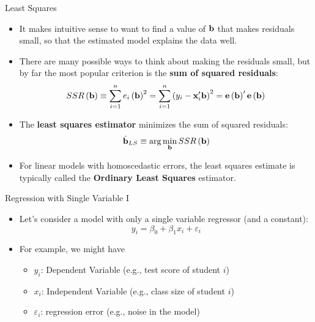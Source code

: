 \documentclass[english,xcolor={dvipsnames},aspectratio=169]{beamer}
\begin{document}
\begin{frame}{Least Squares}
\begin{itemize}
	\item It makes intuitive sense to want to find a value of ${\bf b}$
	 that makes residuals small, so that the estimated model explains the data well.

	\smallskip
	\item There are many possible ways to think about making the residuals small, but
	by far the most popular criterion is the {\bf sum of squared residuals}:\[
		SSR\left({\bf b}\right) \equiv \sum_{i=1}^{n} e_i \left({\bf b}\right)^2  =  \sum_{i=1}^{n} \left(y_i - {\bf x}_i' {\bf b}\right)^{2} = {\bf e} \left({\bf b}\right) '  {\bf e} \left({\bf b}\right)
	\]

	\smallskip
	\item The {\bf least squares estimator} minimizes the sum of squared residuals:\[
		\hat{{\bf b}}_{LS} \equiv \arg \min_{{\bf b}} SSR\left({\bf b}\right) 
	\]

	\smallskip
	\item For linear models with homoscedastic errors, the least squares estimate is typically called the
	{\bf Ordinary Least Squares} estimator.

\end{itemize}
\end{frame}



\begin{frame}{Regression with Single Variable I}
	\begin{itemize}
	
	\item Let's consider a model with only a single variable regressor (and a constant):\[
	y_i = \beta_0 + \beta_1 x_i + \varepsilon_i
	\]

	\medskip
	\item For example, we might have 
	\begin{itemize}
		\item $y_i$: Dependent Variable (e.g., test score of student $i$)
		\item $x_i$: Independent Variable (e.g., class size of student $i$)
		\item $\varepsilon_i$: regression error (e.g., noise in the model)
	\end{itemize}

	\end{itemize}
\end{frame}
\end{document}
